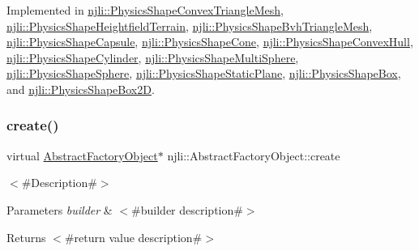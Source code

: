 Implemented in \mbox{\hyperlink{classnjli_1_1_physics_shape_convex_triangle_mesh_abe17d7d9dd1c880e76553e2fc7f6da2b}{njli\+::\+Physics\+Shape\+Convex\+Triangle\+Mesh}}, \mbox{\hyperlink{classnjli_1_1_physics_shape_heightfield_terrain_a67209a4c37b16ff0de98ac273296f2b0}{njli\+::\+Physics\+Shape\+Heightfield\+Terrain}}, \mbox{\hyperlink{classnjli_1_1_physics_shape_bvh_triangle_mesh_a04d31d1728e5c858f3e5c91f00933d1d}{njli\+::\+Physics\+Shape\+Bvh\+Triangle\+Mesh}}, \mbox{\hyperlink{classnjli_1_1_physics_shape_capsule_a02e303c62d9e0924d4e7649b9bd7bffd}{njli\+::\+Physics\+Shape\+Capsule}}, \mbox{\hyperlink{classnjli_1_1_physics_shape_cone_a17be301f4efefa570239611a65a8dd8e}{njli\+::\+Physics\+Shape\+Cone}}, \mbox{\hyperlink{classnjli_1_1_physics_shape_convex_hull_aa9ec0cd740c7401ec7aefc8329b72ce1}{njli\+::\+Physics\+Shape\+Convex\+Hull}}, \mbox{\hyperlink{classnjli_1_1_physics_shape_cylinder_a594a3ced7daabd53c425d79f6bfb4173}{njli\+::\+Physics\+Shape\+Cylinder}}, \mbox{\hyperlink{classnjli_1_1_physics_shape_multi_sphere_a0a9f8e9382af4fb1115abf8bcb035931}{njli\+::\+Physics\+Shape\+Multi\+Sphere}}, \mbox{\hyperlink{classnjli_1_1_physics_shape_sphere_a048ff733f942dcac60a7d2b382a1d0a3}{njli\+::\+Physics\+Shape\+Sphere}}, \mbox{\hyperlink{classnjli_1_1_physics_shape_static_plane_a43560ce1d910b68d20f602ab1fc03631}{njli\+::\+Physics\+Shape\+Static\+Plane}}, \mbox{\hyperlink{classnjli_1_1_physics_shape_box_a0aa7607b93e89ea9fe1c6a73e44ec1d0}{njli\+::\+Physics\+Shape\+Box}}, and \mbox{\hyperlink{classnjli_1_1_physics_shape_box2_d_a14716c113a5f559ffde6051a018bb7a2}{njli\+::\+Physics\+Shape\+Box2D}}.

\mbox{\label{classnjli_1_1_physics_shape_a83a8876ae63b92804004cf3febe76573}} 
\subsubsection{\texorpdfstring{create()}{create()}\hspace{0.1cm}{\footnotesize\ttfamily [1/2]}}
{\footnotesize\ttfamily virtual \mbox{\hyperlink{classnjli_1_1_abstract_factory_object}{Abstract\+Factory\+Object}}$\ast$ njli\+::\+Abstract\+Factory\+Object\+::create}

$<$\#\+Description\#$>$


\begin{DoxyParams}{Parameters}
{\em builder} & $<$\#builder description\#$>$\\
\hline
\end{DoxyParams}
\begin{DoxyReturn}{Returns}
$<$\#return value description\#$>$ 
\end{DoxyReturn}
\mbox{\label{classnjli_1_1_physics_shape_a701dbac9216cbda5493851634ade84c3}} 
